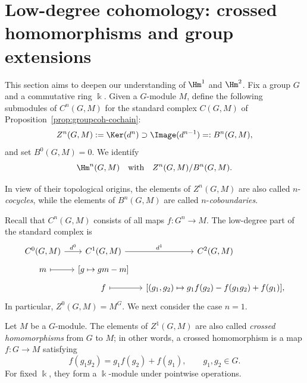 
\section{Low-degree cohomology: crossed homomorphisms and group extensions}
\label{sec:grp-low-degree}
\hypertarget{o014.aljabr2.chapter6.low-degree-cohomology}{ }

This section aims to deepen our understanding of $\Hm^1$ and $\Hm^2$.
Fix a group $G$ and a commutative ring $\Bbbk$. Given a $G$-module $M$,
define the following submodules of $C^n(G,M)$ for the standard complex
$C(G,M)$ of Proposition~\ref{prop:groupcoh-cochain}:
\[ Z^n(G,M):=\Ker(d^n)\supset\Image(d^{n-1})=:B^n(G,M), \]
and set $B^0(G,M)=0$. We identify
\begin{equation*}
	\Hm^n(G,M)\quad\text{with}\quad Z^n(G,M)/B^n(G,M).
\end{equation*}

In view of their topological origins, the elements of $Z^n(G,M)$ are also
called $n$-\emph{cocycles}, while the elements of $B^n(G,M)$ are called
$n$-\emph{coboundaries}.

Recall that $C^n(G,M)$ consists of all maps $f:G^n\to M$. The low-degree
part of the standard complex is
\[\begin{tikzcd}[row sep=tiny, column sep=small]
	C^0(G,M) \arrow[r,"{d^0}"] & C^1(G,M) \arrow[r,"{d^1}"] & C^2(G,M) \\
	m \arrow[mapsto,r] & {[g\mapsto gm-m]} & \\
	& f \arrow[mapsto,r] &
	{[(g_1,g_2)\mapsto g_1f(g_2)-f(g_1g_2)+f(g_1)]},
\end{tikzcd}\]
In particular, $Z^0(G,M)=M^G$. We next consider the case $n=1$.

\begin{definition}\label{def:crossed-homomorphism}
	Let $M$ be a $G$-module. The elements of $Z^1(G,M)$ are also called
	\emph{crossed homomorphisms} from $G$ to $M$; in other words, a crossed
	homomorphism is a map $f:G\to M$ satisfying
	\[ f(g_1g_2)=g_1f(g_2)+f(g_1),\qquad g_1,g_2\in G. \]
	For fixed $\Bbbk$, they form a $\Bbbk$-module under pointwise operations.
\end{definition}

